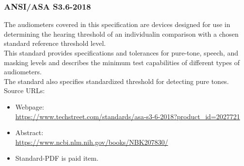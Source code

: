 \documentclass[12pt,]{article}
\begin{document}
	\subsubsection{ANSI/ASA S3.6-2018 }
	The audiometers covered in this specification are devices designed for use in determining the hearing threshold
	of an individualin comparison with a chosen standard reference threshold level.\\
	This standard provides specifications and tolerances for pure-tone, speech,
	and masking levels and describes the minimum test capabilities of different types of audiometers.\\
	The standard also specifies standardized threshold for detecting pure tones.\\
	
	Source URLs:
	\begin{itemize}
		\item Webpage:\\
		\url{https://www.techstreet.com/standards/asa-s3-6-2018?product_id=2027721}\\
		
		\item Abstract:\\
		\url{https://www.ncbi.nlm.nih.gov/books/NBK207830/}
		
		\item Standard-PDF is paid item.
	\end{itemize}
\end{document}

